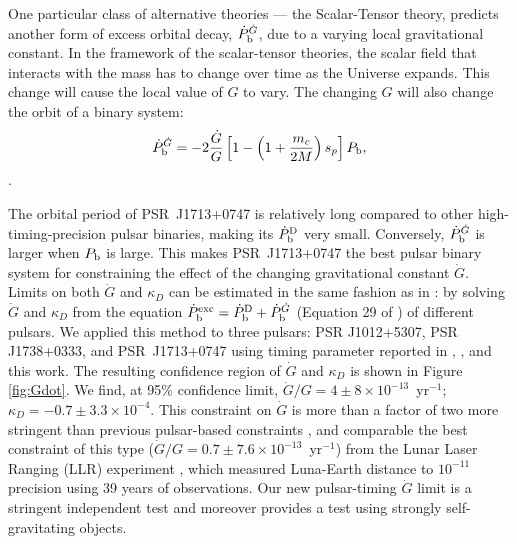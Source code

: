One particular class of alternative theories --- the Scalar-Tensor theory,
predicts another form of excess orbital decay, $\dot{P}_{\rm b}^{\dot{G}}$,
due to a varying
local gravitational constant. In the framework of the scalar-tensor theories,
the scalar field that interacts with the mass has to change over time as the
Universe expands. This change will cause the local value of
$G$ to vary. The changing $G$ will also change
the orbit of a binary system:
\begin{equation}
\dot{P}_{\rm b}^{\dot{G}} = -2 \frac{\dot{G}}{G}
\left[1-\left(1+\frac{m_c}{2M}\right)s_p\right]P_{\rm b},
\end{equation} \citep{dgt88,nor90}.

The orbital period of PSR~J1713+0747 is relatively long compared to other
high-timing-precision pulsar binaries, making its $\dot{P}_{\rm b}^{\rm D}$
very small. Conversely, $\dot{P}_{\rm b}^{\dot{G}}$ is larger when $P_{\rm b}$
is large. This makes PSR~J1713+0747 the best pulsar binary system for constraining
the effect of the changing gravitational constant $\dot{G}$. Limits 
on both $\dot{G}$ and $\kappa_D$ can be estimated in the same fashion as in
\citet{lwj+09}: by solving $\dot{G}$ and $\kappa_D$
from the equation $\dot{P}_{\rm b}^{\rm exc} = \dot{P}_{\rm b}^{\rm D} +
\dot{P}_{\rm b}^{\dot{G}}$ (Equation 29 of \citealt{lwj+09}) of different
pulsars. We applied this method to three pulsars: PSR J1012+5307, PSR
J1738+0333, and PSR~J1713+0747 using timing parameter reported in
\citet{lwj+09}, \citet{fwe+12}, and this work.
The resulting confidence region of $\dot{G}$ and $\kappa_D$ is shown in Figure
\ref{fig:Gdot}.
We find, at 95\% confidence limit, $\dot{G}/G =
4\pm8\times10^{-13}$~yr$^{-1}$; $\kappa_D=-0.7\pm3.3\times10^{-4}$. 
This constraint on $\dot{G}$ is more than a factor of two more stringent than
previous pulsar-based constraints \citep{fwe+12}, and comparable
the best constraint of this type
($\dot{G}/G=0.7\pm7.6\times10^{-13}$~yr$^{-1}$) from the Lunar Laser Ranging
(LLR)
experiment \citep{hmb10}, which measured Luna-Earth distance to $10^{-11}$
precision using 39 years of observations.
Our new pulsar-timing  $\dot{G}$ limit is a stringent independent test
and moreover provides a test using strongly self-gravitating objects.


